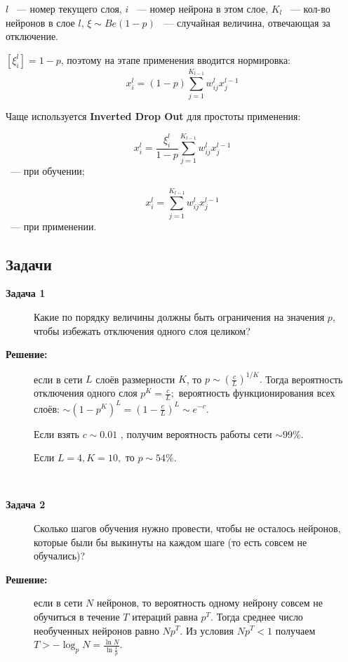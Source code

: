 $l$ ~--- номер текущего слоя, $i$ ~--- номер нейрона в этом слое, $K_l$ ~--- кол-во нейронов в слое $l$, $\xi \sim Be(1-p)$ ~--- случайная величина, отвечающая за отключение.

$\left[\xi_i^l\right] = 1-p$, поэтому на этапе применения вводится нормировка:
$$x_i^l = (1-p) \sum_{j=1}^{K_{l-1}} w_{ij}^l x_j^{l-1} $$

Чаще используется \textbf{Inverted Drop Out} для простоты применения:

$$x_i^l = \frac{\xi_i^l}{1-p} \sum_{j=1}^{K_{l-1}} w_{ij}^l x_j^{l-1} $$
~--- при обучении;

$$x_i^l = \sum_{j=1}^{K_{l-1}} w_{ij}^l x_j^{l-1} $$
~--- при применении.

\subsection{Задачи}
\begin{description}
\item[\textbf{Задача 1}] 
    Какие по порядку величины должны быть ограничения на значения $p$, чтобы избежать отключения одного слоя целиком?
\item[\textbf{Решение:}] если в сети $L$ слоёв размерности $K$, то $p \sim (\frac{c}{L})^{1/K}. $
    Тогда вероятность отключения одного слоя $p^K = \frac{c}{L}; $ вероятность функционирования всех слоёв: $\sim (1-p^K)^L = (1-\frac{c}{L})^L \sim e^{-c}$.
    
    Если взять $c\sim 0.01$ , получим вероятность работы сети $\sim 99\%$.
    
    Если $L=4, K=10,$ то $p \sim 54\%$.

\

\item[\textbf{Задача 2}] 
    Сколько шагов обучения нужно провести, чтобы не осталось нейронов, которые были бы выкинуты на каждом шаге (то есть совсем не обучались)?

\item[\textbf{Решение:}] если в сети $N$ нейронов, то вероятность одному нейрону совсем не обучиться в течение $T$ итераций равна $p^T$. Тогда среднее число необученных нейронов равно $Np^T$. Из условия $Np^T<1$ получаем $T>-\log_{p}N = \frac{\ln N}{\ln \frac{1}{p}}$.
\end{description}
